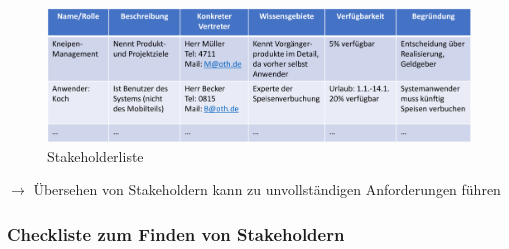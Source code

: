 \documentclass[11pt, a4paper]{article}
\begin{document}
\begin{figure}[h]
    \centering
    \includegraphics[width=1\textwidth]{Stakeholder-00}
    \caption{Stakeholderliste}
    \label{fig:Stakeholder-00}
\end{figure}

$ \rightarrow $ Übersehen von Stakeholdern kann zu unvollständigen Anforderungen führen

\subsubsection*{Checkliste zum Finden von Stakeholdern}
\end{document}
